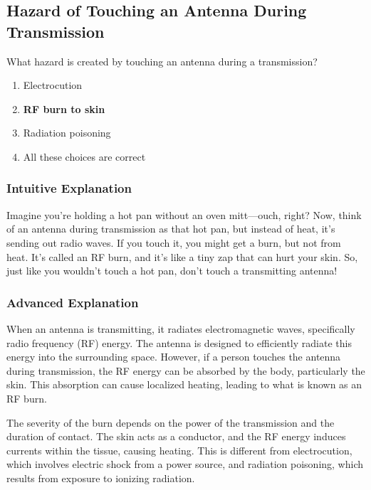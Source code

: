 \subsection{Hazard of Touching an Antenna During Transmission}
\label{T0C07}

\begin{tcolorbox}[colback=gray!10!white,colframe=black!75!black,title=T0C07]
What hazard is created by touching an antenna during a transmission?
\begin{enumerate}[label=\Alph*)]
    \item Electrocution
    \item \textbf{RF burn to skin}
    \item Radiation poisoning
    \item All these choices are correct
\end{enumerate}
\end{tcolorbox}

\subsubsection{Intuitive Explanation}
Imagine you’re holding a hot pan without an oven mitt—ouch, right? Now, think of an antenna during transmission as that hot pan, but instead of heat, it’s sending out radio waves. If you touch it, you might get a burn, but not from heat. It’s called an RF burn, and it’s like a tiny zap that can hurt your skin. So, just like you wouldn’t touch a hot pan, don’t touch a transmitting antenna!

\subsubsection{Advanced Explanation}
When an antenna is transmitting, it radiates electromagnetic waves, specifically radio frequency (RF) energy. The antenna is designed to efficiently radiate this energy into the surrounding space. However, if a person touches the antenna during transmission, the RF energy can be absorbed by the body, particularly the skin. This absorption can cause localized heating, leading to what is known as an RF burn.

The severity of the burn depends on the power of the transmission and the duration of contact. The skin acts as a conductor, and the RF energy induces currents within the tissue, causing heating. This is different from electrocution, which involves electric shock from a power source, and radiation poisoning, which results from exposure to ionizing radiation.

